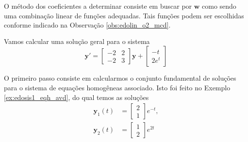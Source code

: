 O método dos coeficientes a determinar consiste em buscar por $\pmb{w}$ como sendo uma combinação linear de funções adequadas. Tais funções podem ser escolhidas conforme indicado na Observação \ref{obs:edolin_o2_mcd}.

\begin{ex}
  Vamos calcular uma solução geral para o sistema
  \begin{equation}\label{eq:ex_edosis1_eqnh}
    \pmb{y}' =
    \begin{bmatrix}
      -2 & 2 \\
      -2 & 3
    \end{bmatrix}\pmb{y} +
    \begin{bmatrix}
      -t \\
      2e^{t}
    \end{bmatrix}
  \end{equation}

  O primeiro passo consiste em calcularmos o conjunto fundamental de soluções para o sistema de equações homogêneas associado. Isto foi feito no Exemplo \ref{ex:edosis1_eqh_avd}, do qual temos as soluções
\begin{align}
  \pmb{y}_1(t) &=
                 \begin{bmatrix}
                   2\\
                   1
                 \end{bmatrix}e^{-t},\\
  \pmb{y}_2(t) &=
                 \begin{bmatrix}
                   1\\
                   2
                 \end{bmatrix}e^{2t}
\end{align}


\end{ex}
